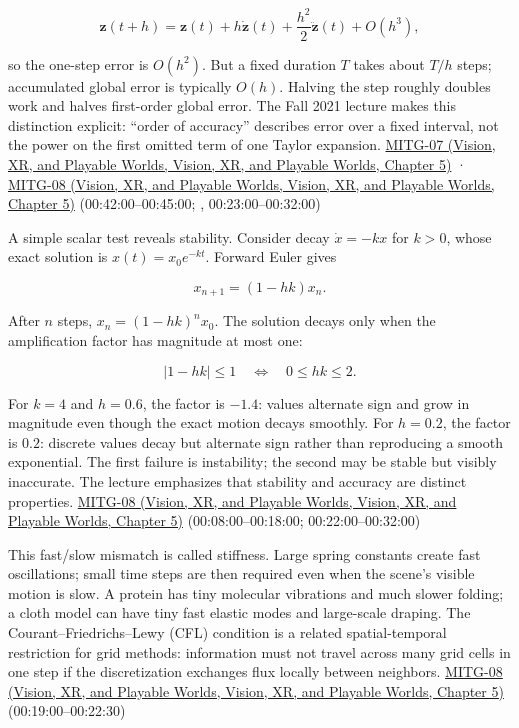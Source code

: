 \[
\boldsymbol{z}(t+h)=\boldsymbol{z}(t)+h\dot{\boldsymbol{z}}(t)
+\frac{h^2}{2}\ddot{\boldsymbol{z}}(t)+O(h^3),
\]

so the one-step error is \(O(h^2)\). But a fixed duration \(T\) takes about \(T/h\) steps; accumulated global error is typically \(O(h)\). Halving the step roughly doubles work and halves first-order global error. The Fall 2021 lecture makes this distinction explicit: ``order of accuracy'' describes error over a fixed interval, not the power on the first omitted term of one Taylor expansion. \href{../07-Vision-XR-and-Playable-Worlds/main.pdf\#nameddest=04-visual-computing-ii-ch036-mitg-07---particle-systems}{MITG-07 (Vision, XR, and Playable Worlds, Vision, XR, and Playable Worlds, Chapter 5)} · \href{../07-Vision-XR-and-Playable-Worlds/main.pdf\#nameddest=04-visual-computing-ii-ch036-mitg-08---cloth-simulation}{MITG-08 (Vision, XR, and Playable Worlds, Vision, XR, and Playable Worlds, Chapter 5)} (00:42:00--00:45:00; , 00:23:00--00:32:00)

A simple scalar test reveals stability. Consider decay \(\dot{x}=-kx\) for \(k>0\), whose exact solution is \(x(t)=x_0e^{-kt}\). Forward Euler gives

\[
x_{n+1}=(1-hk)x_n.
\]

After \(n\) steps, \(x_n=(1-hk)^nx_0\). The solution decays only when the amplification factor has magnitude at most one:

\[
|1-hk|\le1\quad\Longleftrightarrow\quad 0\le hk\le2.
\]

For \(k=4\) and \(h=0.6\), the factor is \(-1.4\): values alternate sign and grow in magnitude even though the exact motion decays smoothly. For \(h=0.2\), the factor is \(0.2\): discrete values decay but alternate sign rather than reproducing a smooth exponential. The first failure is instability; the second may be stable but visibly inaccurate. The lecture emphasizes that stability and accuracy are distinct properties. \href{../07-Vision-XR-and-Playable-Worlds/main.pdf\#nameddest=04-visual-computing-ii-ch036-mitg-08---cloth-simulation}{MITG-08 (Vision, XR, and Playable Worlds, Vision, XR, and Playable Worlds, Chapter 5)} (00:08:00--00:18:00; 00:22:00--00:32:00)

This fast/slow mismatch is called stiffness. Large spring constants create fast oscillations; small time steps are then required even when the scene's visible motion is slow. A protein has tiny molecular vibrations and much slower folding; a cloth model can have tiny fast elastic modes and large-scale draping. The Courant--Friedrichs--Lewy (CFL) condition is a related spatial-temporal restriction for grid methods: information must not travel across many grid cells in one step if the discretization exchanges flux locally between neighbors. \href{../07-Vision-XR-and-Playable-Worlds/main.pdf\#nameddest=04-visual-computing-ii-ch036-mitg-08---cloth-simulation}{MITG-08 (Vision, XR, and Playable Worlds, Vision, XR, and Playable Worlds, Chapter 5)} (00:19:00--00:22:30)

